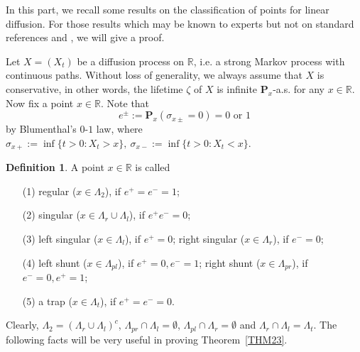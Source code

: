 \documentclass[a4paper]{amsart}
\theoremstyle{definition}
\newtheorem{definition}[theorem]{Definition}
\theoremstyle{remark}
\numberwithin{equation}{section}
\begin{document}
In this part, we recall some results on the classification of points for linear diffusion. For those results which may be known to experts but not on standard references \cite[\S5]{I57} and \cite[\S3]{IM74}, we will give a proof.

Let $X=(X_t)$ be a diffusion process on $\mathbb{R}$, i.e. a strong Markov process with continuous paths. Without loss of generality, we always assume that $X$ is conservative, in other words, the lifetime $\zeta$ of $X$ is infinite $\mathbf{P}_x$-a.s. for any $x\in \mathbb{R}$. Now fix a point $x\in \mathbb{R}$. Note that
\[
	e^{\pm}:=\mathbf{P}_x(\sigma_{x\pm}=0)=0\text{ or }1
\]
by Blumenthal's $0$-$1$ law, where $\sigma_{x+}:=\inf\{t>0: X_t>x\},\ \sigma_{x-}:=\inf\{t>0: X_t<x\}$.

\begin{definition} A point $x\in\mathbb{R}$ is called
\begin{itemize}
\item[(1)] regular ($x\in \Lambda_2$), if $e^+=e^-=1$;
\item[(2)] singular ($x\in \Lambda_r\cup \Lambda_l$), if $e^+e^-=0$;
\item[(3)] left singular ($x\in \Lambda_l$), if $e^+=0$; right singular ($x\in \Lambda_r$), if $e^-=0$;
\item[(4)] left shunt ($x\in \Lambda_{pl}$), if $e^+=0, e^-=1$; right shunt ($x\in \Lambda_{pr}$), if $e^-=0, e^+=1$;
\item[(5)] a trap ($x\in \Lambda_t$), if $e^+=e^-=0$.
\end{itemize}
\end{definition}

Clearly, $\Lambda_2=\left(\Lambda_r\cup \Lambda_l\right)^c$, $\Lambda_{pr}\cap \Lambda_{l}=\emptyset$, $\Lambda_{pl}\cap \Lambda_{r}=\emptyset$ and $\Lambda_r\cap \Lambda_l=\Lambda_t$. The following facts will be very useful in proving Theorem~\ref{THM23}.
\end{document}
